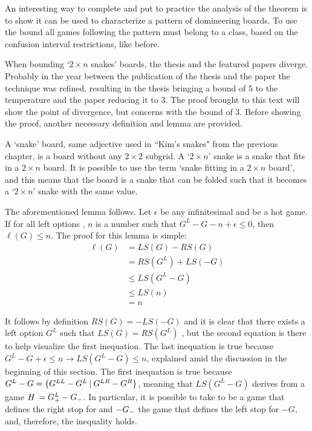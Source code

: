 An interesting way to complete and put to practice the analysis of the theorem is to show it can be used to characterize a pattern of domineering boards. To use the bound all games following the pattern must belong to a class, based on the confusion interval restrictions, like before.

When bounding `$2\times n$ snakes' boards, the thesis and the featured papers diverge. Probably in the year between the publication of the thesis and the paper the technique was refined, resulting in the thesis bringing a bound of $5$ to the temperature and the paper reducing it to $3$. The proof brought to this text will show the point of divergence, but concerns with the bound of $3$. Before showing the proof, another necessary definition and lemma are provided.

A `snake' board, same adjective used in ``Kim's snakes" from the previous chapter, is a board without any $2\times 2$ subgrid. A `$2\times n$' snake is a snake that fits in a $2\times n$ board. It is possible to use the term `snake fitting in a $2\times n$ board', and this means that the board is a snake that can be folded such that it becomes a `$2\times n$' snake with the same value.

The aforementioned lemma follows. Let $\epsilon$ be any infinitesimal and \Gm{} be a hot game. If for all left options , $n$ is a number such that $G^L - G - n +\epsilon \leq 0$, then $\ell(G) \leq n$. The proof for this lemma is simple:
\begin{align*}
	\ell(G) &= LS(G) - RS(G) \\
	&= RS(G^L) + LS(-G) \\
	&\leq LS(G^L - G) \\
	&\leq LS(n) \\
	&= n
\end{align*}

It follows by definition $RS(G) = - LS(-G)$ and it is clear that there exists a left option $G^L$ such that $LS(G) = RS(G^L)$ , but the second equation is there to help visualize the first inequation. The last inequation is true because $G^L - G + \epsilon \leq n \longrightarrow LS(G^L-G)\leq n$, explained amid the discussion in the beginning of this section. The first inequation is true because $G^L - G = \mbox{$\{G^{LL}-G^L\:|\:G^{LR}-G^R\}$}$, meaning that $LS(G^L-G)$ derives from a game $\mbox{$H\,$} = \mbox{$G^L_+$} - \mbox{$G_-$}$. In particular, it is possible to take  to be a game that defines the right stop for  and $-\mbox{$G_-$}$ the game that defines the left stop for $-G$, and, therefore, the inequality holds.

